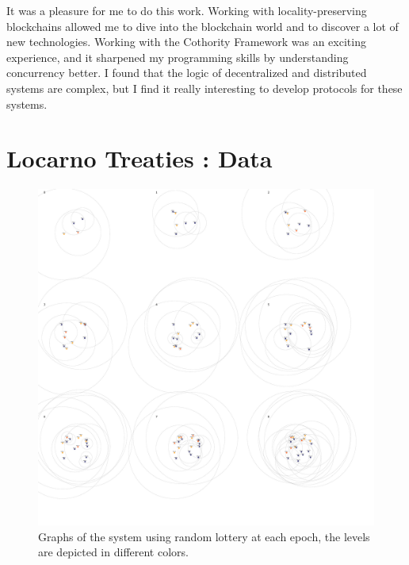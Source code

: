 \documentclass[a4paper,11pt,twoside=semi,openright]{report}
\begin{document}
It was a pleasure for me to do this work. Working with locality-preserving
blockchains allowed me to dive into the blockchain world and to discover a lot
of new technologies. Working with the Cothority Framework was an exciting
experience, and it sharpened my programming skills by understanding concurrency better. I found that the logic of decentralized and distributed systems
are complex, but I find it really interesting to develop protocols for these
systems. 


\cleardoublepage {} {}



\printbibliography


\let\savecleardoublepage\cleardoublepage
\let\cleardoublepage\clearpage 
\appendix %

\chapter{Locarno Treaties : Data} \label{app:LocarnoTreaties-data}

\begin{figure}[!h] 
\centering
\includegraphics[width=350pt]{figures/LocarnoTreaties-RandomFinal}
\caption{Graphs of the system using random lottery at each epoch, the levels are depicted in different colors.}
\label{fig:LocarnoTreaties-RandomFinal}
\end{figure}
\end{document}
